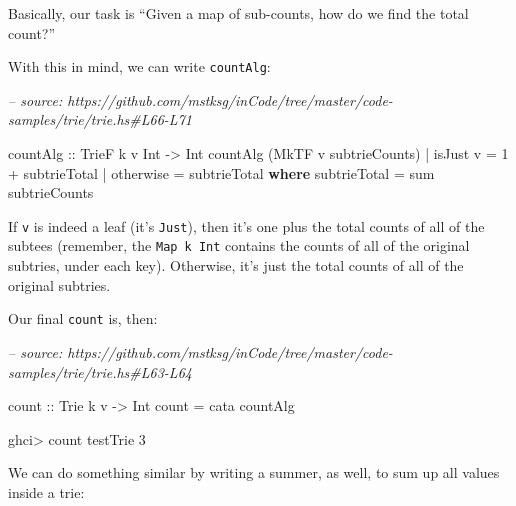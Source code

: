 \documentclass[]{article}
\newenvironment{Shaded}{}{}
\newcommand{\CommentTok}[1]{\textcolor[rgb]{0.38,0.63,0.69}{\textit{#1}}}
\newcommand{\DataTypeTok}[1]{\textcolor[rgb]{0.56,0.13,0.00}{#1}}
\newcommand{\DecValTok}[1]{\textcolor[rgb]{0.25,0.63,0.44}{#1}}
\newcommand{\FunctionTok}[1]{\textcolor[rgb]{0.02,0.16,0.49}{#1}}
\newcommand{\KeywordTok}[1]{\textcolor[rgb]{0.00,0.44,0.13}{\textbf{#1}}}
\newcommand{\NormalTok}[1]{#1}
\newcommand{\OtherTok}[1]{\textcolor[rgb]{0.00,0.44,0.13}{#1}}
\begin{document}
Basically, our task is ``Given a map of sub-counts, how do we find the total
count?''

With this in mind, we can write \texttt{countAlg}:

\begin{Shaded}
\begin{Highlighting}[]
\CommentTok{-- source: https://github.com/mstksg/inCode/tree/master/code-samples/trie/trie.hs#L66-L71}

\OtherTok{countAlg ::} \DataTypeTok{TrieF}\NormalTok{ k v }\DataTypeTok{Int} \OtherTok{->} \DataTypeTok{Int}
\NormalTok{countAlg (}\DataTypeTok{MkTF}\NormalTok{ v subtrieCounts)}
    \FunctionTok{|}\NormalTok{ isJust v  }\FunctionTok{=} \DecValTok{1} \FunctionTok{+}\NormalTok{ subtrieTotal}
    \FunctionTok{|} \FunctionTok{otherwise} \FunctionTok{=}\NormalTok{ subtrieTotal}
  \KeywordTok{where}
\NormalTok{    subtrieTotal }\FunctionTok{=} \FunctionTok{sum}\NormalTok{ subtrieCounts}
\end{Highlighting}
\end{Shaded}

If \texttt{v} is indeed a leaf (it's \texttt{Just}), then it's one plus the
total counts of all of the subtees (remember, the \texttt{Map\ k\ Int} contains
the counts of all of the original subtries, under each key). Otherwise, it's
just the total counts of all of the original subtries.

Our final \texttt{count} is, then:

\begin{Shaded}
\begin{Highlighting}[]
\CommentTok{-- source: https://github.com/mstksg/inCode/tree/master/code-samples/trie/trie.hs#L63-L64}

\OtherTok{count ::} \DataTypeTok{Trie}\NormalTok{ k v }\OtherTok{->} \DataTypeTok{Int}
\NormalTok{count }\FunctionTok{=}\NormalTok{ cata countAlg}
\end{Highlighting}
\end{Shaded}

\begin{Shaded}
\begin{Highlighting}[]
\NormalTok{ghci}\FunctionTok{>}\NormalTok{ count testTrie}
\DecValTok{3}
\end{Highlighting}
\end{Shaded}

We can do something similar by writing a summer, as well, to sum up all values
inside a trie:
\end{document}
